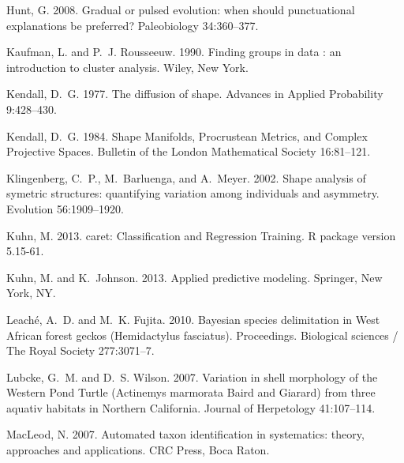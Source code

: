 \documentclass[12pt,letterpaper]{article}
\begin{document}
\begin{thebibliography}{77}
    Hunt, G. 2008. {Gradual or pulsed evolution: when should punctuational
    explanations be preferred?} Paleobiology 34:360--377.

    Kaufman, L. and P.~J. Rousseeuw. 1990. {Finding groups in data : an
    introduction to cluster analysis}. Wiley, New York.

    Kendall, D.~G. 1977. {The diffusion of shape}. Advances in Applied Probability
    9:428--430.

    Kendall, D.~G. 1984. {Shape Manifolds, Procrustean Metrics, and Complex
    Projective Spaces}. Bulletin of the London Mathematical Society 16:81--121.

    Klingenberg, C.~P., M.~Barluenga, and A.~Meyer. 2002. {Shape analysis of
    symetric structures: quantifying variation among individuals and asymmetry}.
    Evolution 56:1909--1920.

    Kuhn, M. 2013. caret: Classification and Regression Training. R package version
    5.15-61.

    Kuhn, M. and K.~Johnson. 2013. {Applied predictive modeling}. Springer, New
    York, NY.

    Leach\'{e}, A.~D. and M.~K. Fujita. 2010. {Bayesian species delimitation in
    West African forest geckos (Hemidactylus fasciatus).} Proceedings. Biological
    sciences / The Royal Society 277:3071--7.

    Lubcke, G.~M. and D.~S. Wilson. 2007. {Variation in shell morphology of the
      Western Pond Turtle (Actinemys marmorata Baird and Giarard) from three
    aquativ habitats in Northern California}. Journal of Herpetology 41:107--114.

    MacLeod, N. 2007. {Automated taxon identification in systematics: theory,
    approaches and applications}. CRC Press, Boca Raton.


\end{thebibliography}
\end{document}
